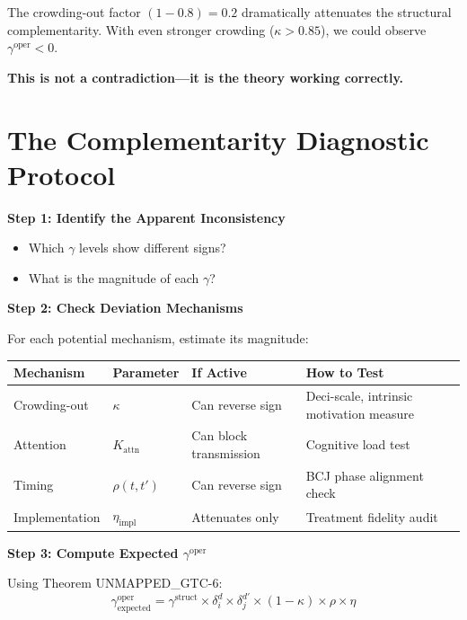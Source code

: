 The crowding-out factor $(1 - 0.8) = 0.2$ dramatically attenuates the
structural complementarity. With even stronger crowding ($\kappa > 0.85$),
we could observe $\gamma^{\text{oper}} < 0$.

\textbf{This is not a contradiction---it is the theory working correctly.}

\section{The Complementarity Diagnostic Protocol}
\label{sec:gtc-diagnostic}

\begin{tcolorbox}[colback=yellow!5!white, colframe=yellow!75!black,
    title=Diagnostic Protocol: When $\gamma$ Values Seem Inconsistent]

\textbf{Step 1: Identify the Apparent Inconsistency}
\begin{itemize}[nosep]
    \item Which $\gamma$ levels show different signs?
    \item What is the magnitude of each $\gamma$?
\end{itemize}

\textbf{Step 2: Check Deviation Mechanisms}

For each potential mechanism, estimate its magnitude:

\begin{center}
\renewcommand{\arraystretch}{1.3}
\begin{tabular}{llll}
\textbf{Mechanism} & \textbf{Parameter} & \textbf{If Active} & \textbf{How to Test} \\
\hline
Crowding-out & $\kappa$ & Can reverse sign & Deci-scale, intrinsic motivation measure \\
Attention & $K_{\text{attn}}$ & Can block transmission & Cognitive load test \\
Timing & $\rho(t,t')$ & Can reverse sign & BCJ phase alignment check \\
Implementation & $\eta_{\text{impl}}$ & Attenuates only & Treatment fidelity audit \\
\end{tabular}
\end{center}

\textbf{Step 3: Compute Expected $\gamma^{\text{oper}}$}

Using Theorem UNMAPPED_GTC-6:
\begin{equation}
\gamma^{\text{oper}}_{\text{expected}} = \gamma^{\text{struct}} \times \delta_i^d \times \delta_j^{d'} \times (1-\kappa) \times \rho \times \eta
\end{equation}


\end{tcolorbox}
